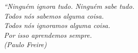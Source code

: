 \begin{epigrafe}
    \vspace*{\fill}
    \begin{flushright}
        \textit{``Ninguém ignora tudo. Ninguém sabe tudo. \\
        Todos nós sabemos alguma coisa. \\
        Todos nós ignoramos alguma coisa.\\
        Por isso aprendemos sempre. \\
        (Paulo Freire)}
    \end{flushright}
\end{epigrafe}
